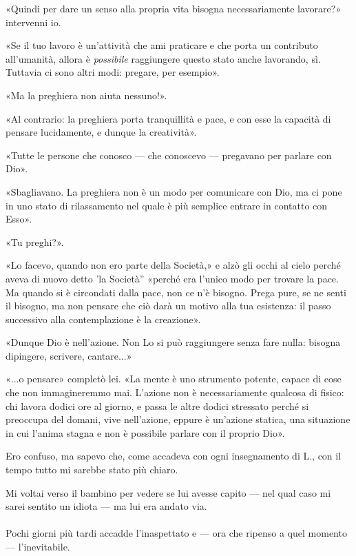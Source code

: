 \documentclass[a4paper,12pt]{book}
\begin{document}
«Quindi per dare un senso alla propria vita bisogna necessariamente lavorare?»
intervenni io.

«Se il tuo lavoro è un'attività che ami praticare e che porta un contributo
all'umanità, allora è \emph{possibile} raggiungere questo stato anche lavorando,
sì. Tuttavia ci sono altri modi: pregare, per esempio».

«Ma la preghiera non aiuta nessuno!».

«Al contrario: la preghiera porta tranquillità e pace, e con esse la capacità
di pensare lucidamente, e dunque la creatività».

«Tutte le persone che conosco --- che conoscevo --- pregavano per parlare con
Dio».

«Sbagliavano. La preghiera non è un modo per comunicare con Dio, ma ci pone in
uno stato di rilassamento nel quale è più semplice entrare in contatto con
Esso».

«Tu preghi?».

«Lo facevo, quando non ero parte della Società,» e alzò gli occhi al cielo
perché aveva di nuovo detto 'la Società'' «perché era l'unico modo per trovare
la pace. Ma quando si è circondati dalla pace, non ce n'è bisogno. Prega pure,
se ne senti il bisogno, ma non pensare che ciò darà un motivo alla tua
esistenza: il passo successivo alla contemplazione è la creazione».

«Dunque Dio è nell'azione. Non Lo si può raggiungere senza fare nulla: bisogna
dipingere, scrivere, cantare...»

«...o pensare» completò lei. «La mente è uno strumento potente, capace di cose
che non immagineremmo mai. L'azione non è necessariamente qualcosa di fisico:
chi lavora dodici ore al giorno, e passa le altre dodici stressato perché si
preoccupa del domani, vive nell'azione, eppure è un'azione statica, una
situazione in cui l'anima stagna e non è possibile parlare con il proprio Dio».

Ero confuso, ma sapevo che, come accadeva con ogni insegnamento di L., con il
tempo tutto mi sarebbe stato più chiaro.

Mi voltai verso il bambino per vedere se lui avesse capito --- nel qual caso mi
sarei sentito un idiota --- ma lui era andato via.

\paragraph{}
Pochi giorni più tardi accadde l'inaspettato e --- ora che ripenso a quel
momento --- l'inevitabile.
\end{document}
